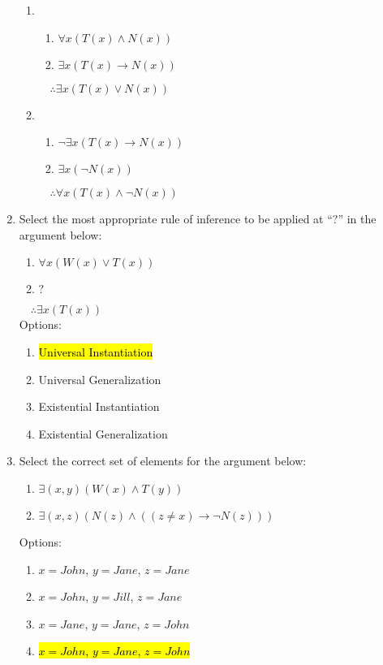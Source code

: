 \documentclass{article}
\renewcommand{\implies}{\rightarrow}
\begin{document}
\begin{enumerate}
\begin{enumerate}
\item 
\begin{enumerate}[label =(\arabic*), ref = \arabic*]
	\item $\forall x(T(x)\land N(x))$
	\item $\exists x(T(x)\implies N(x))$
\end{enumerate} 
$\quad \therefore \exists x(T(x)\lor N(x))$\vspace{3pt}

\item 
\begin{enumerate}[label =(\arabic*), ref = \arabic*]
	\item $\neg\exists x(T(x)\implies N(x))$
	\item $\exists x(\neg N(x))$
\end{enumerate} 
$\quad \therefore \forall x(T(x)\land \neg N(x))$\vspace{3pt}

\end{enumerate}

\item Select the most appropriate rule of inference to be applied at ``$?$'' in the argument below:
\begin{enumerate}[label =(\arabic*), ref = \arabic*]
	\item $\forall x(W(x)\lor T(x))$
	\item $?$
\end{enumerate} 
$\quad \therefore\exists x(T(x))$\vspace{3pt}\\
Options:
\begin{enumerate}
\item \hl{Universal Instantiation}
\item Universal Generalization
\item Existential Instantiation
\item Existential Generalization
\end{enumerate}

\item Select the correct set of elements for the argument below:
\begin{enumerate}[label =(\arabic*), ref = \arabic*]
	\item $\exists (x,y)(W(x)\land T(y))$
	\item $\exists (x,z)(N(z)\land ((z\neq x)\implies \neg N(z)))$
\end{enumerate} 
Options:
\begin{enumerate}
\item $x=John$, $y=Jane$, $z=Jane$
\item $x=John$, $y=Jill$, $z=Jane$
\item $x=Jane$, $y=Jane$, $z=John$
\item \hl{$x=John$, $y=Jane$, $z=John$}
\end{enumerate}


\end{enumerate}
\end{document}
